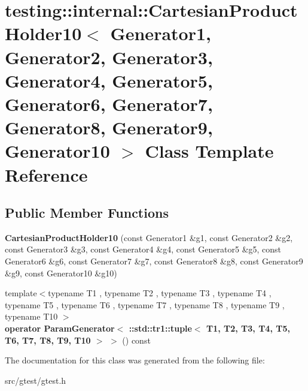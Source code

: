 \hypertarget{classtesting_1_1internal_1_1_cartesian_product_holder10}{}\section{testing\+:\+:internal\+:\+:Cartesian\+Product\+Holder10$<$ Generator1, Generator2, Generator3, Generator4, Generator5, Generator6, Generator7, Generator8, Generator9, Generator10 $>$ Class Template Reference}
\label{classtesting_1_1internal_1_1_cartesian_product_holder10}
\subsection*{Public Member Functions}
\begin{DoxyCompactItemize}
\item 
\mbox{\label{classtesting_1_1internal_1_1_cartesian_product_holder10_a3255f824dd20e02b8bb718bb7d3d3634}} 
{\bfseries Cartesian\+Product\+Holder10} (const Generator1 \&g1, const Generator2 \&g2, const Generator3 \&g3, const Generator4 \&g4, const Generator5 \&g5, const Generator6 \&g6, const Generator7 \&g7, const Generator8 \&g8, const Generator9 \&g9, const Generator10 \&g10)
\item 
\mbox{\label{classtesting_1_1internal_1_1_cartesian_product_holder10_a5b641f902afbe973d0ceacfe68b5ed3c}} 
{\footnotesize template$<$typename T1 , typename T2 , typename T3 , typename T4 , typename T5 , typename T6 , typename T7 , typename T8 , typename T9 , typename T10 $>$ }\\{\bfseries operator Param\+Generator$<$ \+::std\+::tr1\+::tuple$<$ T1, T2, T3, T4, T5, T6, T7, T8, T9, T10 $>$ $>$} () const
\end{DoxyCompactItemize}


The documentation for this class was generated from the following file\+:\begin{DoxyCompactItemize}
\item 
src/gtest/gtest.\+h\end{DoxyCompactItemize}
